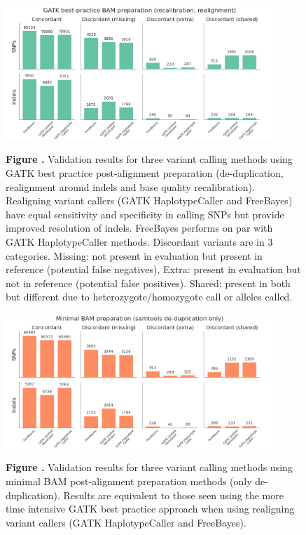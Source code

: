 \documentclass{frontiersSCNS}
\begin{document}
\begin{figure}[tbp]
\begin{center}
\includegraphics[width=0.9\textwidth]{validation-gatkprep}
\end{center}
 \textbf{\label{fig:01} Figure .}{
   Validation results for three variant calling methods using GATK best practice
 post-alignment preparation (de-duplication, realignment around indels and base
 quality recalibration). Realigning variant callers (GATK HaplotypeCaller and
 FreeBayes) have equal sensitivity and specificity in calling SNPs but provide
 improved resolution of indels. FreeBayes performs on par with GATK
 HaplotypeCaller methods. Discordant variants are in 3 categories. Missing: not
 present in evaluation but present in reference (potential false negatives),
 Extra: present in evaluation but not in reference (potential false
 positives). Shared: present in both but different due to
 heterozygote/homozygote call or alleles called.}
\end{figure}

\begin{figure}[tbp]
\begin{center}
\includegraphics[width=0.9\textwidth]{validation-noprep}
\end{center}
 \textbf{\label{fig:02} Figure .}{
   Validation results for three variant calling methods using minimal BAM
   post-alignment preparation methods (only de-duplication). Results are
   equivalent to those seen using the more time intensive GATK best practice
   approach when using realigning variant callers (GATK HaplotypeCaller and FreeBayes).}
\end{figure}
\end{document}
